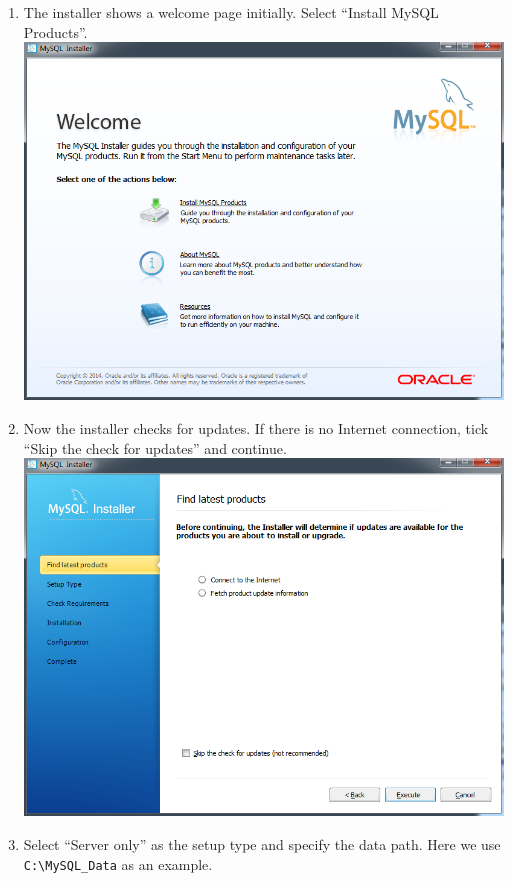 \begin{enumerate}
\def\labelenumi{\arabic{enumi}.}
\itemsep1pt\parskip0pt
\item
  The installer shows a welcome page initially. Select ``Install MySQL
  Products''. \includegraphics{img/mysql_1.png}
\item
  Now the installer checks for updates. If there is no Internet
  connection, tick ``Skip the check for updates'' and continue.
  \includegraphics{img/mysql_2.png}
\item
  Select ``Server only'' as the setup type and specify the data path.
  Here we use \texttt{C:\textbackslash{}MySQL\_Data} as an example.

\end{enumerate}
